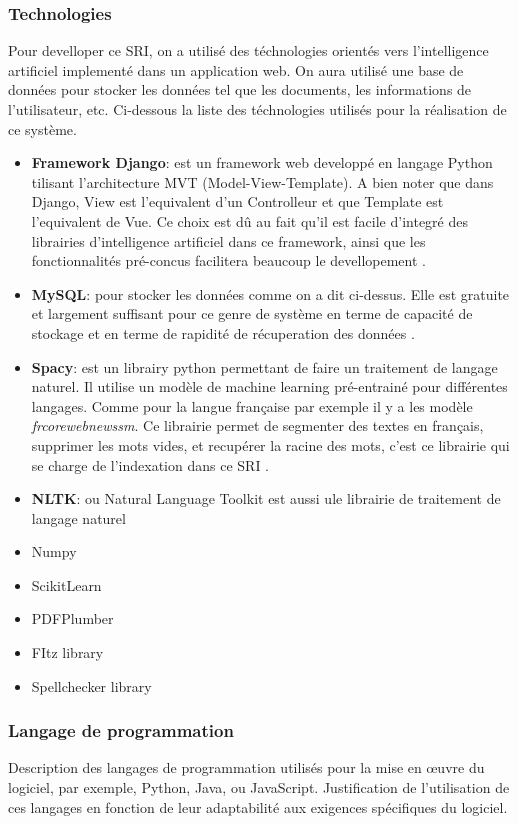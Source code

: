\subsubsection{Technologies}
Pour develloper ce SRI, on a utilisé des téchnologies orientés vers l'intelligence artificiel implementé dans un application web. On aura utilisé une base de données pour stocker les données tel que les documents, les informations de l'utilisateur, etc. Ci-dessous la liste des téchnologies utilisés pour la réalisation de ce système.

\begin{itemize}
    \item \textbf{Framework Django}: est un framework web developpé en langage Python tilisant l'architecture MVT (Model-View-Template). A bien noter que dans Django, View est l'equivalent d'un Controlleur et que Template est l'equivalent de Vue. Ce choix est dû au fait qu'il est facile d'integré des librairies d'intelligence artificiel dans ce framework, ainsi que les fonctionnalités pré-concus facilitera beaucoup le devellopement \citep*{django}.
    \item \textbf{MySQL}: pour stocker les données comme on a dit ci-dessus. Elle est gratuite et largement suffisant pour ce genre de système en terme de capacité de stockage et en terme de rapidité de récuperation des données \citep*{mysql}.
    \item \textbf{Spacy}: est un librairy python permettant de faire un traitement de langage naturel. Il utilise un modèle de machine learning pré-entrainé pour différentes langages. Comme pour la langue française par exemple il y a les modèle \emph{frcorewebnewssm}. Ce librairie permet de segmenter des textes en français, supprimer les mots vides, et recupérer la racine des mots, c'est ce librairie qui se charge de l'indexation dans ce SRI \citep*{spacy}.
    \item \textbf{NLTK}: ou Natural Language Toolkit est aussi ule librairie de traitement de langage naturel \citep*{nltk}
    \item Numpy \citep*{numpy}
    \item ScikitLearn \citep*{scikit-learn}
    \item PDFPlumber \citep*{pdfplumber}
    \item FItz library \citep*{fitz}
    \item Spellchecker library \citep*{spellchecker}
\end{itemize}

\subsubsection{Langage de programmation}
Description des langages de programmation utilisés pour la mise en œuvre du logiciel, par exemple, Python, Java, ou JavaScript. Justification de l'utilisation de ces langages en fonction de leur adaptabilité aux exigences spécifiques du logiciel.

